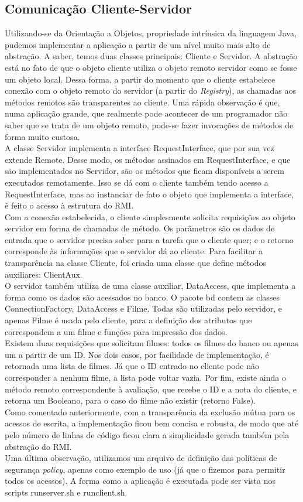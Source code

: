 \documentclass[11pt,twoside]{article}
\begin{document}
\subsection{Comunicação Cliente-Servidor}
Utilizando-se da Orientação a Objetos, propriedade intrínsica da linguagem Java, pudemos implementar a aplicação a partir de um nível muito mais alto de abstração. A saber, temos duas classes principais: Cliente e Servidor. A abstração está no fato de que o objeto cliente utiliza o objeto remoto servidor como se fosse um objeto local. Dessa forma, a partir do momento que o cliente estabelece conexão com o objeto remoto do servidor (a partir do \textit{Registry}), as chamadas aos métodos remotos são transparentes ao cliente. Uma rápida observação é que, numa aplicação grande, que realmente pode acontecer de um programador não saber que se trata de um objeto remoto, pode-se fazer invocações de métodos de forma muito custosa.\\
A classe Servidor implementa a interface RequestInterface, que por sua vez extende Remote. Desse modo, os métodos assinados em RequestInterface, e que são implementados no Servidor, são os métodos que ficam disponíveis a serem executados remotamente. Isso se dá com o cliente também tendo acesso a RequestInterface, mas ao instanciar de fato o objeto que implementa a interface, é feito o acesso à estrutura do RMI.\\
Com a conexão estabelecida, o cliente simplesmente solicita requisições ao objeto servidor em forma de chamadas de método. Os parâmetros são os dados de entrada que o servidor precisa saber para a tarefa que o cliente quer; e o retorno corresponde às informações que o servidor dá ao cliente. Para facilitar a transparência na classe Cliente, foi criada uma classe que define métodos auxiliares: ClientAux.\\
O servidor também utiliza de uma classe auxiliar, DataAccess, que implementa a forma como os dados são acessados no banco. O pacote bd contem as classes ConnectionFactory, DataAccess e Filme. Todas são utilizadas pelo servidor, e apenas Filme é usada pelo cliente, para a definição dos atributos que correspondem a um filme e funções para impressão dos dados.\\
Existem duas requisições que solicitam filmes: todos os filmes do banco ou apenas um a partir de um ID. Nos dois casos, por facilidade de implementação, é retornada uma lista de filmes. Já que o ID entrado no cliente pode não corresponder a nenhum filme, a lista pode voltar vazia. Por fim, existe ainda o método remoto correspondente à avaliação, que recebe o ID e a nota do cliente, e retorna um Booleano, para o caso do filme não existir (retorno False).\\
Como comentado anteriormente, com a transparência da exclusão mútua para os acessos de escrita, a implementação ficou bem concisa e robusta, de modo que até pelo número de linhas de código ficou clara a simplicidade gerada também pela abstração do RMI.\\
Uma última observação, utilizamos um arquivo de definição das políticas de segurança \textit{policy}, apenas como exemplo de uso (já que o fizemos para permitir todos os acessos). A forma como a aplicação é executada pode ser vista nos scripts runserver.sh e runclient.sh.
\end{document}
